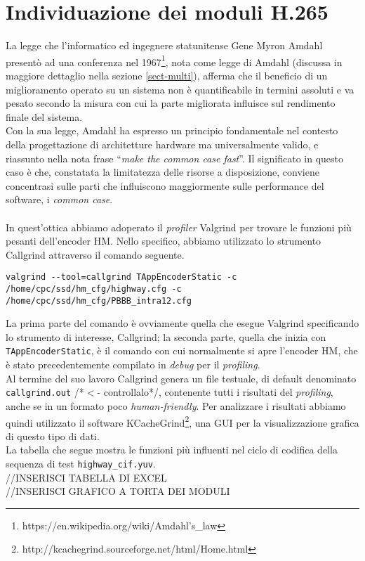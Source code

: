 \section{Individuazione dei moduli H.265}
La legge che l'informatico ed ingegnere statunitense Gene Myron Amdahl presentò 
ad una conferenza nel 
1967\footnote{https://en.wikipedia.org/wiki/Amdahl's\_law}, nota come legge di 
Amdahl (discussa in maggiore dettaglio nella sezione 
\ref{sect-multi}), afferma che il beneficio di un miglioramento operato su un 
sistema non è quantificabile in termini assoluti e va pesato secondo la misura 
con 
cui la parte migliorata influisce sul rendimento finale del sistema. \\
Con la sua legge, Amdahl ha espresso un principio fondamentale nel 
contesto della progettazione di architetture hardware ma universalmente valido, 
e riassunto nella nota frase ``\emph{make the common case fast}''. Il 
significato in questo caso è che, constatata la limitatezza delle risorse a 
disposizione, 
conviene concentrasi sulle parti che influiscono maggiormente 
sulle performance del software, i \emph{common case}.
\\ \\
In quest'ottica abbiamo adoperato il \emph{profiler} Valgrind per trovare le 
funzioni più pesanti dell'encoder HM. Nello specifico, abbiamo utilizzato lo 
strumento Callgrind attraverso il comando seguente. \\
\begin{lstlisting}[breaklines]
valgrind --tool=callgrind TAppEncoderStatic -c 
/home/cpc/ssd/hm_cfg/highway.cfg -c 
/home/cpc/ssd/hm_cfg/PBBB_intra12.cfg
\end{lstlisting}
La prima parte del comando è ovviamente quella che esegue Valgrind specificando 
lo strumento di interesse, Callgrind; la seconda parte, quella che inizia con 
\verb|TAppEncoderStatic|, è il comando con cui normalmente si apre l'encoder 
HM, che è stato precedentemente compilato in \emph{debug} per il 
\emph{profiling}. \\
Al termine del suo lavoro Callgrind genera un file testuale, di default 
denominato \verb|callgrind.out| /*$<$- controllalo*/, contenente tutti i 
risultati 
del \emph{profiling}, anche se in un formato poco \emph{human-friendly}. 
Per analizzare i risultati abbiamo quindi utilizzato il software 
KCacheGrind\footnote{http://kcachegrind.sourceforge.net/html/Home.html}, una 
GUI per la visualizzazione grafica di questo tipo di dati. \\
La tabella che segue mostra le funzioni più influenti nel ciclo di codifica 
della sequenza di test \verb|highway_cif.yuv|.
\\ //INSERISCI TABELLA DI EXCEL
\\ //INSERISCI GRAFICO A TORTA DEI MODULI
